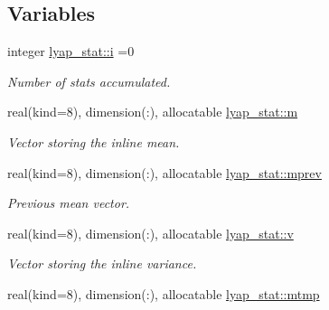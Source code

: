 \subsection*{Variables}
\begin{DoxyCompactItemize}
\item 
integer \hyperlink{namespacelyap__stat_ae22963543caef680f536738ad6018008}{lyap\+\_\+stat\+::i} =0
\begin{DoxyCompactList}\small\item\em Number of stats accumulated. \end{DoxyCompactList}\item 
real(kind=8), dimension(\+:), allocatable \hyperlink{namespacelyap__stat_a99687dc4df185df56e841e0d87d1faae}{lyap\+\_\+stat\+::m}
\begin{DoxyCompactList}\small\item\em Vector storing the inline mean. \end{DoxyCompactList}\item 
real(kind=8), dimension(\+:), allocatable \hyperlink{namespacelyap__stat_ad4c65ab53e8f6e8d6a967fd7bc0caa60}{lyap\+\_\+stat\+::mprev}
\begin{DoxyCompactList}\small\item\em Previous mean vector. \end{DoxyCompactList}\item 
real(kind=8), dimension(\+:), allocatable \hyperlink{namespacelyap__stat_a7cc5265a7fac9300755528c599fb08fb}{lyap\+\_\+stat\+::v}
\begin{DoxyCompactList}\small\item\em Vector storing the inline variance. \end{DoxyCompactList}\item 
real(kind=8), dimension(\+:), allocatable \hyperlink{namespacelyap__stat_a72cd3ecc682d386dbe39e331afa90f9f}{lyap\+\_\+stat\+::mtmp}
\end{DoxyCompactItemize}
